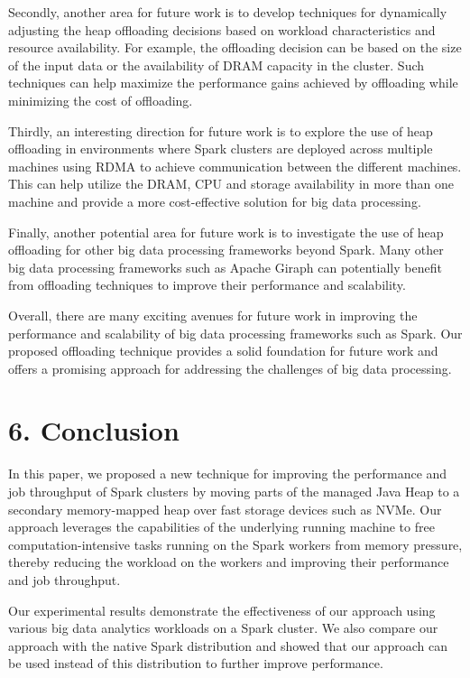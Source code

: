 \documentclass[twocolumn,10pt]{asme2e}
\begin{document}
Secondly, another area for future work is to develop techniques for dynamically adjusting the heap offloading decisions based on workload characteristics and resource availability. For example, the offloading decision can be based on the size of the input data or the availability of DRAM capacity in the cluster. Such techniques can help maximize the performance gains achieved by offloading while minimizing the cost of offloading.

Thirdly, an interesting direction for future work is to explore the use of heap offloading in environments where Spark clusters are deployed across multiple machines using RDMA to achieve communication between the different machines. This can help utilize the DRAM, CPU and storage availability in more than one machine and provide a more cost-effective solution for big data processing.

Finally, another potential area for future work is to investigate the use of heap offloading for other big data processing frameworks beyond Spark. Many other big data processing frameworks such as Apache Giraph can potentially benefit from offloading techniques to improve their performance and scalability.

Overall, there are many exciting avenues for future work in improving the performance and scalability of big data processing frameworks such as Spark. Our proposed offloading technique provides a solid foundation for future work and offers a promising approach for addressing the challenges of big data processing.

\section*{6. Conclusion}

In this paper, we proposed a new technique for improving the performance and job throughput of Spark clusters by moving parts of the managed Java Heap to a secondary memory-mapped heap over fast storage devices such as NVMe. Our approach leverages the capabilities of the underlying running machine to free computation-intensive tasks running on the Spark workers from memory pressure, thereby reducing the workload on the workers and improving their performance and job throughput.

Our experimental results demonstrate the effectiveness of our approach using various big data analytics workloads on a Spark cluster. We also compare our approach with the native Spark distribution and showed that our approach can be used instead of this distribution to further improve performance.
\end{document}
